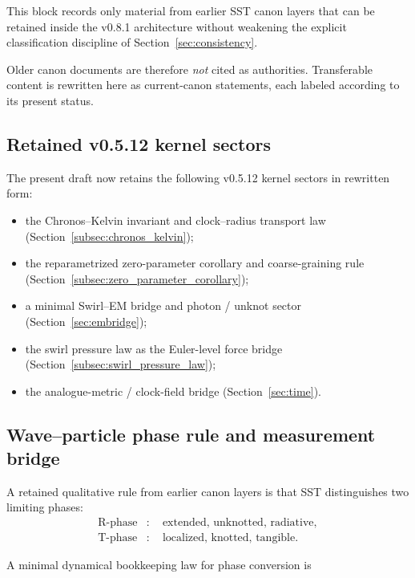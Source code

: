 \documentclass[11pt]{article}
\theoremstyle{definition}
\theoremstyle{plain}
\theoremstyle{remark}
\begin{document}
        This block records only material from earlier SST canon layers that can be retained inside the v0.8.1 architecture without weakening the explicit classification discipline of Section~\ref{sec:consistency}.

        Older canon documents are therefore \emph{not} cited as authorities. Transferable content is rewritten here as current-canon statements, each labeled according to its present status.

    \subsection{Retained v0.5.12 kernel sectors}

        The present draft now retains the following v0.5.12 kernel sectors in rewritten form:
        \begin{itemize}
            \item the Chronos--Kelvin invariant and clock--radius transport law (Section~\ref{subsec:chronos_kelvin});
            \item the reparametrized zero-parameter corollary and coarse-graining rule (Section~\ref{subsec:zero_parameter_corollary});
            \item a minimal Swirl--EM bridge and photon / unknot sector (Section~\ref{sec:embridge});
            \item the swirl pressure law as the Euler-level force bridge (Section~\ref{subsec:swirl_pressure_law});
            \item the analogue-metric / clock-field bridge (Section~\ref{sec:time}).
        \end{itemize}

    \subsection{Wave--particle phase rule and measurement bridge}
        \label{subsec:measurement_bridge}

        A retained qualitative rule from earlier canon layers is that SST distinguishes two limiting phases:
        \begin{align}
            \text{R-phase} &:\quad \text{extended, unknotted, radiative}, \\
            \text{T-phase} &:\quad \text{localized, knotted, tangible}.
        \end{align}

        A minimal dynamical bookkeeping law for phase conversion is
\end{document}
